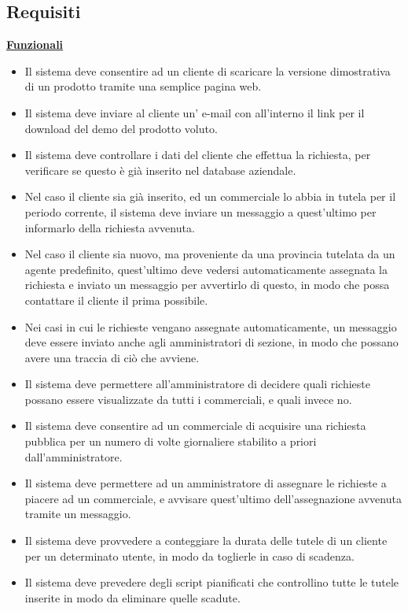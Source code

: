 \subsection{Requisiti}
\underline{\textbf{Funzionali}}
\begin{itemize}
  \item Il sistema deve consentire ad un cliente di scaricare la versione dimostrativa di un prodotto tramite una semplice pagina web.
  \item Il sistema deve inviare al cliente un' e-mail con all'interno il link per il download del demo del prodotto voluto. 
  \item Il sistema deve controllare i dati del cliente che effettua la richiesta, per verificare se questo \`e gi\`a inserito nel database aziendale.
  \item Nel caso il cliente sia gi\`a inserito, ed un commerciale lo abbia in tutela per il periodo corrente, il sistema deve inviare un messaggio a quest'ultimo per informarlo della richiesta avvenuta.
  \item Nel caso il cliente sia nuovo, ma proveniente da una provincia tutelata da un agente predefinito, quest'ultimo deve vedersi automaticamente assegnata la richiesta e inviato un messaggio per avvertirlo di questo, in modo che possa contattare il cliente il prima possibile.
  \item Nei casi in cui le richieste vengano assegnate automaticamente, un messaggio deve essere inviato anche agli amministratori di sezione, in modo che possano avere una traccia di ci\`o che avviene.
  \item Il sistema deve permettere all'amministratore di decidere quali richieste possano essere visualizzate da tutti i commerciali, e quali invece no.
  \item Il sistema deve consentire ad un commerciale di acquisire una richiesta pubblica per un numero di volte giornaliere stabilito a priori dall'amministratore.
  \item Il sistema deve permettere ad un amministratore di assegnare le richieste a piacere ad un commerciale, e avvisare quest'ultimo dell'assegnazione avvenuta tramite un messaggio.
  \item Il sistema deve provvedere a conteggiare la durata delle tutele di un cliente per un determinato utente, in modo da toglierle in caso di scadenza.
  \item Il sistema deve prevedere degli script pianificati che controllino tutte le tutele inserite in modo da eliminare quelle scadute.
\end{itemize}

